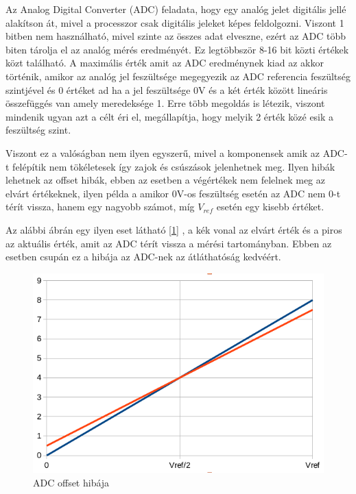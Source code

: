 Az Analog Digital Converter (ADC) feladata, hogy egy analóg jelet digitális jellé
alakítson át, mivel a processzor csak digitális jeleket képes feldolgozni. Viszont 
1 bitben nem használható, mivel szinte az összes adat elveszne, ezért az ADC több 
biten tárolja el az analóg mérés eredményét. Ez legtöbbször 8-16 bit közti értékek 
közt található. A maximális érték amit az ADC eredménynek kiad az akkor történik, 
amikor az analóg jel feszültsége megegyezik az ADC referencia feszültség szintjével 
és 0 értéket ad ha a jel feszültsége 0V és a két érték között lineáris összefüggés 
van amely meredeksége 1. Erre több megoldás is létezik, viszont mindenik ugyan azt a célt éri el, 
megállapítja, hogy melyik 2 érték közé esik a feszültség szint.

Viszont ez a valóságban nem ilyen egyszerű, mivel a komponensek amik az ADC-t 
felépítik nem tökéletesek így zajok és csúszások jelenhetnek meg. Ilyen hibák 
lehetnek az offset hibák, ebben az esetben a végértékek nem felelnek meg az elvárt 
értékeknek, ilyen példa a amikor 0V-os feszültség esetén az ADC nem 0-t térít 
vissza, hanem egy nagyobb számot, míg $V_{ref}$ esetén egy kisebb értéket.

Az alábbi ábrán egy ilyen eset látható [\ref{fig:ADC_Offset_Error}] , a kék vonal az elvárt érték és a piros 
az aktuális érték, amit az ADC térít vissza a mérési tartományban. Ebben az 
esetben csupán ez a hibája az ADC-nek az átláthatóság kedvéért. 


\begin{figure}[h]
    \centering
    \includegraphics[scale=0.3]{figures/images/literature/ADC_Offset_Error.png}
    \caption{ADC offset hibája}
    \label{fig:ADC_Offset_Error}
\end{figure}

